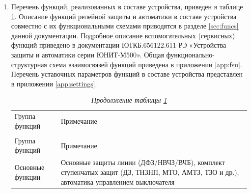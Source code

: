 \documentclass[a4paper, 12pt, table, hidelinks, DIV=calc]{extarticle}
\def\ManualUnitGeneral{ЮТКБ.656122.611 РЭ «Устройства защиты и автоматики серии ЮНИТ-М500»}
\begin{document}
\begin{enumerate}[label=\arabic{section}.\arabic{subsection}.\arabic*, labelsep=7pt, leftmargin=0pt, itemindent=60pt, align=left]

\item
Перечень функций, реализованных в составе устройства, приведен в таблице \ref{desc:tbl1}.
Описание функций релейной защиты и автоматики в составе устройства совместно с их функциональными схемами приводятся в разделе \ref{sec:funcs} данной документации.
Подробное описание вспомогательных (сервисных) функций приведено в документации \ManualUnitGeneral.
Общая функционально-структурная схема взаимосвязей функций приведена в приложении \ref{app:fsu}.
Перечень уставочных параметров функций в составе устройства представлен в приложении \ref{app:settings}.

\small
\setlength{\extrarowheight}{0.05cm} %
\begin{longtable}
{|>{\centering\arraybackslash}m{3.2cm}|>{\centering\arraybackslash}m{13.7cm}|}
\caption{Функции в составе устройства «ЮНИТ-М500-ВЧ»\hfill\vspace{-0.5\baselineskip}}\label{desc:tbl1}\\ 
\hhline{|-|-|}
\rowcolor{gray!30}
Группа функций & Примечание \\ 
\hhline{|-|-|}
\endfirsthead

\caption*{\hspace{3pt}\emph{Продолжение таблицы \ref{desc:tbl1}\hfill\vspace{-0.5\baselineskip}}} \\ %
\hhline{|-|-|}
\rowcolor{gray!30}
Группа функций & Примечание \\ 
\hhline{|-|-|}
\endhead
\hhline{|-|-|}

\endfoot
\endlastfoot

\centering Основные функции & \flushleft\arraybackslash Основные защиты линии (ДФЗ/НВЧЗ/ВЧБ), комплект ступенчатых защит (ДЗ, ТНЗНП, МТО, АМТЗ, ТЗО и др.), автоматика управлением выключателя  \\  \hline


\end{longtable}
\end{enumerate}
\end{document}
